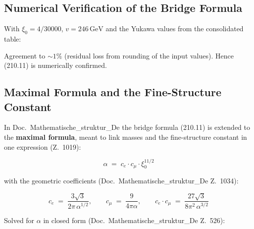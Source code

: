 \subsection*{Numerical Verification of the Bridge Formula}

With $\xi_0 = 4/30000$, $v = 246\,\text{GeV}$ and the Yukawa values
from the consolidated table:

\begin{center}
{\footnotesize
{}
}
\end{center}

Agreement to $\sim 1\%$ (residual loss from rounding of the input
values). Hence (210.11) is numerically confirmed.

\subsection*{Maximal Formula and the Fine-Structure Constant}

In Doc.~Mathematische\_struktur\_De the bridge formula (210.11) is extended
to the \textbf{maximal formula}, meant to link masses and the fine-structure constant in one expression
(Z.~1019):

\begin{equation}
  \boxed{\;\alpha \;=\; c_e \cdot c_\mu \cdot \xi_0^{11/2}\;}
  \tag{210.12}
\end{equation}

with the geometric coefficients (Doc.~Mathematische\_struktur\_De
Z.~1034):

\begin{equation}
  c_e \;=\; \frac{3\sqrt{3}}{2\pi\,\alpha^{1/2}},
  \qquad
  c_\mu \;=\; \frac{9}{4\pi\alpha},
  \qquad
  c_e \cdot c_\mu \;=\; \frac{27\sqrt{3}}{8\pi^2\,\alpha^{3/2}}
  \tag{210.13}
\end{equation}

Solved for $\alpha$ in closed form
(Doc.~Mathematische\_struktur\_De Z.~526):

